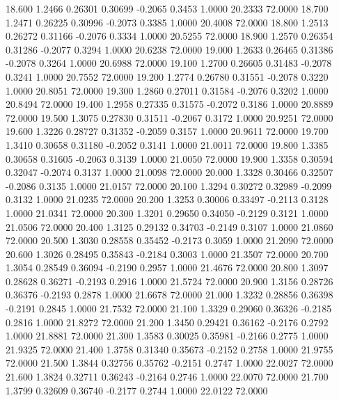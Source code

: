   18.600   1.2466   0.26301   0.30699  -0.2065   0.3453   1.0000  20.2333  72.0000
  18.700   1.2471   0.26225   0.30996  -0.2073   0.3385   1.0000  20.4008  72.0000
  18.800   1.2513   0.26272   0.31166  -0.2076   0.3334   1.0000  20.5255  72.0000
  18.900   1.2570   0.26354   0.31286  -0.2077   0.3294   1.0000  20.6238  72.0000
  19.000   1.2633   0.26465   0.31386  -0.2078   0.3264   1.0000  20.6988  72.0000
  19.100   1.2700   0.26605   0.31483  -0.2078   0.3241   1.0000  20.7552  72.0000
  19.200   1.2774   0.26780   0.31551  -0.2078   0.3220   1.0000  20.8051  72.0000
  19.300   1.2860   0.27011   0.31584  -0.2076   0.3202   1.0000  20.8494  72.0000
  19.400   1.2958   0.27335   0.31575  -0.2072   0.3186   1.0000  20.8889  72.0000
  19.500   1.3075   0.27830   0.31511  -0.2067   0.3172   1.0000  20.9251  72.0000
  19.600   1.3226   0.28727   0.31352  -0.2059   0.3157   1.0000  20.9611  72.0000
  19.700   1.3410   0.30658   0.31180  -0.2052   0.3141   1.0000  21.0011  72.0000
  19.800   1.3385   0.30658   0.31605  -0.2063   0.3139   1.0000  21.0050  72.0000
  19.900   1.3358   0.30594   0.32047  -0.2074   0.3137   1.0000  21.0098  72.0000
  20.000   1.3328   0.30466   0.32507  -0.2086   0.3135   1.0000  21.0157  72.0000
  20.100   1.3294   0.30272   0.32989  -0.2099   0.3132   1.0000  21.0235  72.0000
  20.200   1.3253   0.30006   0.33497  -0.2113   0.3128   1.0000  21.0341  72.0000
  20.300   1.3201   0.29650   0.34050  -0.2129   0.3121   1.0000  21.0506  72.0000
  20.400   1.3125   0.29132   0.34703  -0.2149   0.3107   1.0000  21.0860  72.0000
  20.500   1.3030   0.28558   0.35452  -0.2173   0.3059   1.0000  21.2090  72.0000
  20.600   1.3026   0.28495   0.35843  -0.2184   0.3003   1.0000  21.3507  72.0000
  20.700   1.3054   0.28549   0.36094  -0.2190   0.2957   1.0000  21.4676  72.0000
  20.800   1.3097   0.28628   0.36271  -0.2193   0.2916   1.0000  21.5724  72.0000
  20.900   1.3156   0.28726   0.36376  -0.2193   0.2878   1.0000  21.6678  72.0000
  21.000   1.3232   0.28856   0.36398  -0.2191   0.2845   1.0000  21.7532  72.0000
  21.100   1.3329   0.29060   0.36326  -0.2185   0.2816   1.0000  21.8272  72.0000
  21.200   1.3450   0.29421   0.36162  -0.2176   0.2792   1.0000  21.8881  72.0000
  21.300   1.3583   0.30025   0.35981  -0.2166   0.2775   1.0000  21.9325  72.0000
  21.400   1.3758   0.31340   0.35673  -0.2152   0.2758   1.0000  21.9755  72.0000
  21.500   1.3844   0.32756   0.35762  -0.2151   0.2747   1.0000  22.0027  72.0000
  21.600   1.3824   0.32711   0.36243  -0.2164   0.2746   1.0000  22.0070  72.0000
  21.700   1.3799   0.32609   0.36740  -0.2177   0.2744   1.0000  22.0122  72.0000
